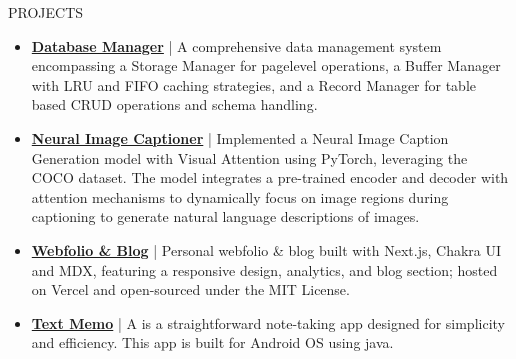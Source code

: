 \documentclass{resume} %
\begin{document}
\vspace{-5pt}
\begin{rSection}{PROJECTS}
   \vspace{0.6em}

   \begin{minipage}[t]{1\textwidth}
      \begin{itemize}[left=0pt, nosep, before=\vspace{-0.5\baselineskip}]
         \item \small \textbf{\href{https://github.com/Prajwal-S-Venkatesh/buffer-manager-c}{Database Manager}} | {A comprehensive data management system encompassing a Storage Manager for page\-level operations, a Buffer Manager with LRU and FIFO caching strategies, and a Record Manager for table based CRUD operations and schema handling.}
         \item \small \textbf{\href{https://github.com/Prajwal-S-Venkatesh/image-captioner}{Neural Image Captioner}} | {Implemented a Neural Image Caption Generation model with Visual Attention using PyTorch, leveraging the COCO dataset. The model integrates a pre-trained encoder and decoder with attention mechanisms to dynamically focus on image regions during captioning to generate natural language descriptions of images.}
         \vspace{0.25em}
         \item \small \textbf{\href{https://blog.prajwalsv.dev}{Webfolio \& Blog}} | {Personal webfolio \& blog built with Next.js, Chakra UI and MDX, featuring a responsive design, analytics, and blog section; hosted on Vercel and open-sourced under the MIT License.}
         \vspace{0.25em}
         \item \small \textbf{\href{https://github.com/Prajwal-S-Venkatesh/TextMemo}{Text Memo}} | {A is a straightforward note-taking app designed for simplicity and efficiency. This app is built for Android OS using java.}
      \end{itemize}
   \end{minipage}
   
   \end{rSection} 
      
\end{document}
